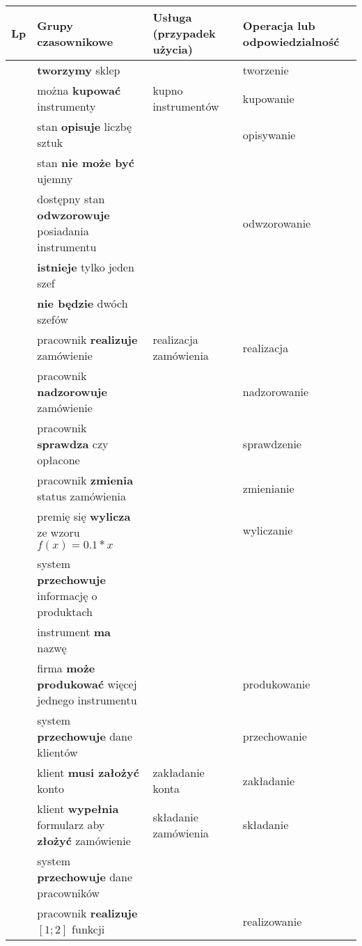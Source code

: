 \documentclass[a4page]{article}
\begin{document}
\begin{table}[tp!]
\begin{adjustwidth}{-4.5cm}{}
\begin{tabular}{|l|l|l|l|}
				\hline
					Lp & Grupy czasownikowe & Usługa (przypadek użycia) & Operacja lub odpowiedzialność\\
				\hline
					\nextrow & \textbf{tworzymy} sklep &  & tworzenie\\
				\hline
					\nextrow & można \textbf{kupować} instrumenty & kupno instrumentów & kupowanie\\
				\hline
					\nextrow & stan \textbf{opisuje} liczbę sztuk &  & opisywanie\\
				\hline
					\nextrow & stan \textbf{nie może być} ujemny &  & \\
				\hline
					\nextrow & dostępny stan \textbf{odwzorowuje} posiadania instrumentu &  & odwzorowanie\\
				\hline
					\nextrow & \textbf{istnieje} tylko jeden szef &  & \\
				\hline
					\nextrow & \textbf{nie będzie} dwóch szefów &  & \\
				\hline
					\nextrow & pracownik \textbf{realizuje} zamówienie & realizacja zamówienia & realizacja\\
				\hline
					\nextrow & pracownik \textbf{nadzorowuje} zamówienie &  & nadzorowanie\\
				\hline
					\nextrow & pracownik \textbf{sprawdza} czy opłacone &  & sprawdzenie\\
				\hline
					\nextrow & pracownik \textbf{zmienia} status zamówienia &  & zmienianie\\
				\hline
					\nextrow & premię się \textbf{wylicza} ze wzoru $f(x) = 0.1 * x$&  & wyliczanie\\
				\hline
					\nextrow & system \textbf{przechowuje} informację o produktach &  & \\
				\hline
					\nextrow & instrument \textbf{ma} nazwę &  & \\
				\hline
					\nextrow & firma \textbf{może produkować} więcej jednego instrumentu &  & produkowanie\\
				\hline
					\nextrow & system \textbf{przechowuje} dane klientów &  & przechowanie\\
				\hline
					\nextrow & klient \textbf{musi założyć} konto & zakładanie konta & zakładanie\\
				\hline
					\nextrow & klient \textbf{wypełnia} formularz aby \textbf{złożyć} zamówienie & składanie zamówienia & składanie\\
				\hline
					\nextrow & system \textbf{przechowuje} dane pracowników &  & \\
				\hline
					\nextrow & pracownik \textbf{realizuje} $[1; 2]$ funkcji &  & realizowanie\\

\end{tabular}
\end{adjustwidth}
\end{table}
\end{document}
